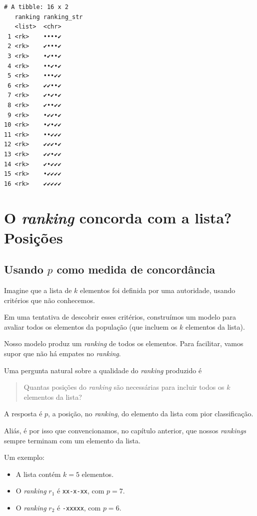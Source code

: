 \documentclass[
  letterpaper,
  DIV=11,
  numbers=noendperiod]{scrreprt}
\begin{document}
\begin{verbatim}
# A tibble: 16 x 2
   ranking ranking_str
   <list>  <chr>      
 1 <rk>    ••••✔      
 2 <rk>    ✔•••✔      
 3 <rk>    •✔••✔      
 4 <rk>    ••✔•✔      
 5 <rk>    •••✔✔      
 6 <rk>    ✔✔••✔      
 7 <rk>    ✔•✔•✔      
 8 <rk>    ✔••✔✔      
 9 <rk>    •✔✔•✔      
10 <rk>    •✔•✔✔      
11 <rk>    ••✔✔✔      
12 <rk>    ✔✔✔•✔      
13 <rk>    ✔✔•✔✔      
14 <rk>    ✔•✔✔✔      
15 <rk>    •✔✔✔✔      
16 <rk>    ✔✔✔✔✔      
\end{verbatim}


\chapter{\texorpdfstring{O \emph{ranking} concorda com a lista?
Posições}{O ranking concorda com a lista? Posições}}\label{o-ranking-concorda-com-a-lista-posiuxe7uxf5es}

\section{\texorpdfstring{Usando $p$ como medida de
concordância}{Usando  como medida de concordância}}\label{usando-p}

Imagine que a lista de $k$ elementos foi definida por uma autoridade,
usando critérios que não conhecemos.

Em uma tentativa de descobrir esses critérios, construímos um modelo
para avaliar todos os elementos da população (que incluem os $k$
elementos da lista).

Nosso modelo produz um \emph{ranking} de todos os elementos. Para
facilitar, vamos supor que não há empates no \emph{ranking}.

Uma pergunta natural sobre a qualidade do \emph{ranking} produzido é

\begin{quote}
Quantas posições do \emph{ranking} são necessárias para incluir todos os
$k$ elementos da lista?
\end{quote}

A resposta é $p$, a posição, no \emph{ranking}, do elemento da lista com
pior classificação.

Aliás, é por isso que convencionamos, no capítulo anterior, que nossos
\emph{rankings} sempre terminam com um elemento da lista.

Um exemplo:

\begin{itemize}
\item
  A lista contém $k = 5$ elementos.
\item
  O \emph{ranking} $r_1$ é \texttt{xx-x-xx}, com $p = 7$.
\item
  O \emph{ranking} $r_2$ é \texttt{-xxxxx}, com $p = 6$.
\end{itemize}
\end{document}

